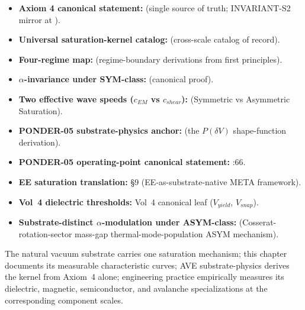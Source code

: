 \begin{itemize}
    \item \textbf{Axiom 4 canonical statement:}  (single source of truth; INVARIANT-S2 mirror at ).
    \item \textbf{Universal saturation-kernel catalog:}  (cross-scale catalog of record).
    \item \textbf{Four-regime map:}  (regime-boundary derivations from first principles).
    \item \textbf{$\alpha$-invariance under SYM-class:}  (canonical proof).
    \item \textbf{Two effective wave speeds ($c_{EM}$ vs $c_{shear}$):}  (Symmetric vs Asymmetric Saturation).
    \item \textbf{PONDER-05 substrate-physics anchor:}  (the $P(\delta V)$ shape-function derivation).
    \item \textbf{PONDER-05 operating-point canonical statement:} :66.
    \item \textbf{EE saturation translation:}  \S 9 (EE-as-substrate-native META framework).
    \item \textbf{Vol~4 dielectric thresholds:} Vol~4 canonical leaf ($V_{yield}$, $V_{snap}$).
    \item \textbf{Substrate-distinct $\alpha$-modulation under ASYM-class:}  (Cosserat-rotation-sector mass-gap thermal-mode-population ASYM mechanism).
\end{itemize}

\noindent
The natural vacuum substrate carries one saturation mechanism; this chapter documents its measurable characteristic curves; AVE substrate-physics derives the kernel from Axiom~4 alone; engineering practice empirically measures its dielectric, magnetic, semiconductor, and avalanche specializations at the corresponding component scales.

